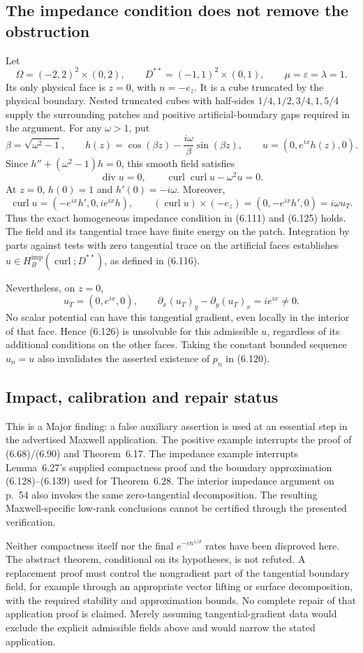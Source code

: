 \documentclass[10pt]{article}
\begin{document}
\subsection*{The impedance condition does not remove the obstruction}
Let \[\Omega=(-2,2)^2\times(0,2),\qquad
 D^{**}=(-1,1)^2\times(0,1),\qquad
 \mu=\varepsilon=\lambda=1.\] Its only physical face is \(z=0\), with \(n=-e_z\). It is a cube truncated by the physical boundary. Nested truncated cubes with half-sides \(1/4,1/2,3/4,1,5/4\) supply the surrounding patches and positive artificial-boundary gaps required in the argument. For any \(\omega>1\), put \[\beta=\sqrt{\omega^2-1},\qquad
 h(z)=\cos(\beta z)-\frac{i\omega}{\beta}\sin(\beta z),
 \qquad u=(0,e^{ix}h(z),0).\] Since \(h''+(\omega^2-1)h=0\), this smooth field satisfies \[\operatorname{div}u=0,\qquad \operatorname{curl}\operatorname{curl}u-\omega^2u=0.\] At \(z=0\), \(h(0)=1\) and \(h'(0)=-i\omega\). Moreover, \[\operatorname{curl}u=(-e^{ix}h',0,ie^{ix}h),\qquad
 (\operatorname{curl}u)\times(-e_z)=(0,-e^{ix}h',0)=i\omega u_T.\] Thus the exact homogeneous impedance condition in (6.111) and (6.125) holds. The field and its tangential trace have finite energy on the patch. Integration by parts against tests with zero tangential trace on the artificial faces establishes \(u\in H_B^{\mathrm{imp}}(\operatorname{curl};D^{**})\), as defined in (6.116).\par
Nevertheless, on \(z=0\), \[u_T=(0,e^{ix},0),\qquad
 \partial_x(u_T)_y-\partial_y(u_T)_x=ie^{ix}\ne0.\] No scalar potential can have this tangential gradient, even locally in the interior of that face. Hence (6.126) is unsolvable for this admissible \(u\), regardless of its additional conditions on the other faces. Taking the constant bounded sequence \(u_n=u\) also invalidates the asserted existence of \(p_n\) in (6.120).\par
\subsection*{Impact, calibration and repair status}
This is a Major finding: a false auxiliary assertion is used at an essential step in the advertised Maxwell application. The positive example interrupts the proof of (6.68)/(6.90) and Theorem 6.17. The impedance example interrupts Lemma 6.27’s supplied compactness proof and the boundary approximation (6.128)–(6.139) used for Theorem 6.28. The interior impedance argument on p. 54 also invokes the same zero-tangential decomposition. The resulting Maxwell-specific low-rank conclusions cannot be certified through the presented verification.\par
Neither compactness itself nor the final \(e^{-cn^{1/d}}\) rates have been disproved here. The abstract theorem, conditional on its hypotheses, is not refuted. A replacement proof must control the nongradient part of the tangential boundary field, for example through an appropriate vector lifting or surface decomposition, with the required stability and approximation bounds. No complete repair of that application proof is claimed. Merely assuming tangential-gradient data would exclude the explicit admissible fields above and would narrow the stated application.\par
\end{document}
